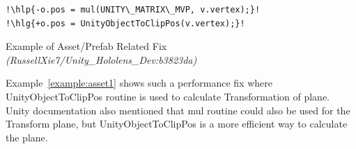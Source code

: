 \begin{example}
\begin{lstlisting}[escapechar=!]
!\hlp{-o.pos = mul(UNITY\_MATRIX\_MVP, v.vertex);}!
!\hlg{+o.pos = UnityObjectToClipPos(v.vertex);}!
\end{lstlisting}
  \caption{Example of Asset/Prefab Related Fix
  	\scriptsize{\textit{(RussellXie7/Unity\_Hololens\_Dev:b3823da)}}}
  \label{example:asset1}  
\end{example}

Example~\ref{example:asset1} shows such a performance fix where UnityObjectToClipPos routine is used to calculate Transformation of plane. Unity documentation also mentioned that mul routine could also be used for the Transform plane, but UnityObjectToClipPos is a more efficient way to calculate the plane.
